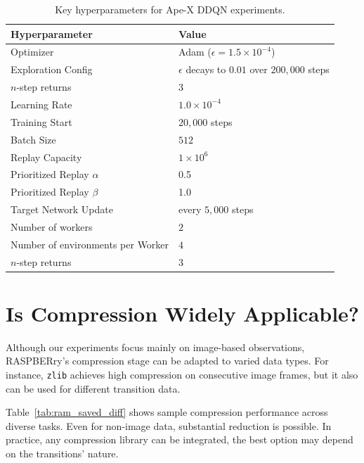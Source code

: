\documentclass[10pt]{article} %
\begin{document}
\begin{table}[h]
\centering
\begin{tabular}{l|l}
\toprule
\textbf{Hyperparameter} & \textbf{Value} \\
\midrule
Optimizer & Adam ($\epsilon = 1.5 \times 10^{-4}$) \\
Exploration Config & $\epsilon$ decays to $0.01$ over $200,000$ steps \\
$n$-step returns & $3$ \\
Learning Rate & $1.0 \times 10^{-4}$ \\
Training Start & $20,000$ steps \\
Batch Size & $512$ \\
Replay Capacity & $1 \times 10^{6}$ \\
Prioritized Replay $\alpha$ & 0.5 \\
Prioritized Replay $\beta$ & 1.0 \\
Target Network Update & every $5,000$ steps \\
Number of workers & $2$ \\
Number of environments per Worker & $4$ \\
$n$-step returns & $3$ \\
\bottomrule
\end{tabular}
\caption{Key hyperparameters for Ape-X DDQN experiments.}
\label{tab:apex_hypers}
\end{table}

\section{Is Compression Widely Applicable?}
\label{apx:compression_applicability}
Although our experiments focus mainly on image-based observations, RASPBERry’s compression stage can be adapted to varied data types.  
For instance, \texttt{zlib} \citep{MadlerZlib_adler_2024} achieves high compression on consecutive image frames, but it also can be used for different transition data.

Table~\ref{tab:ram_saved_diff} shows sample compression performance across diverse tasks.  
Even for non-image data, substantial reduction is possible.  
In practice, any compression library can be integrated, the best option may depend on the transitions' nature.
\end{document}
